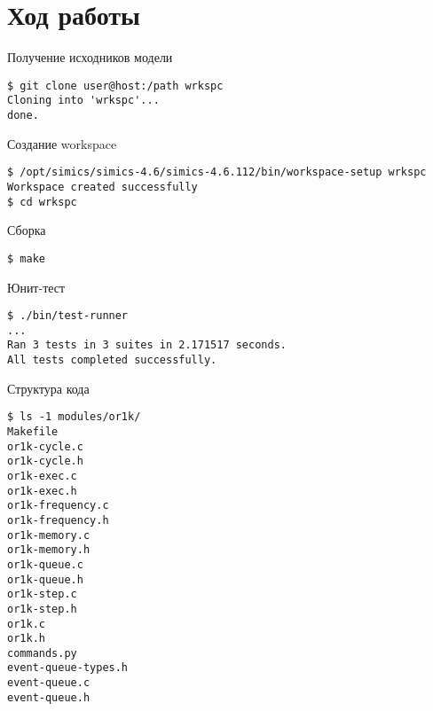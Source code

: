 \documentclass{beamer}
\begin{document}

\section{Ход работы}

\begin{frame}[fragile]{Получение исходников модели}
\begin{verbatim}
$ git clone user@host:/path wrkspc
Cloning into 'wrkspc'...
done.
\end{verbatim}
\end{frame}

\begin{frame}[fragile]{Создание workspace}

\begin{footnotesize}
\begin{verbatim}
$ /opt/simics/simics-4.6/simics-4.6.112/bin/workspace-setup wrkspc
Workspace created successfully
$ cd wrkspc
\end{verbatim}
\end{footnotesize}

\end{frame}

\begin{frame}{Сборка}

\texttt{\$ make}

\end{frame}

\begin{frame}[fragile]{Юнит-тест}

\begin{verbatim}
$ ./bin/test-runner
...
Ran 3 tests in 3 suites in 2.171517 seconds.
All tests completed successfully.
\end{verbatim}

\end{frame}

\begin{frame}[fragile]{Структура кода}
\begin{tiny}
\begin{verbatim}
$ ls -1 modules/or1k/
Makefile
or1k-cycle.c
or1k-cycle.h
or1k-exec.c
or1k-exec.h
or1k-frequency.c
or1k-frequency.h
or1k-memory.c
or1k-memory.h
or1k-queue.c
or1k-queue.h
or1k-step.c
or1k-step.h
or1k.c
or1k.h
commands.py
event-queue-types.h
event-queue.c
event-queue.h
\end{verbatim}
\end{tiny}

\end{frame}
\end{document}
